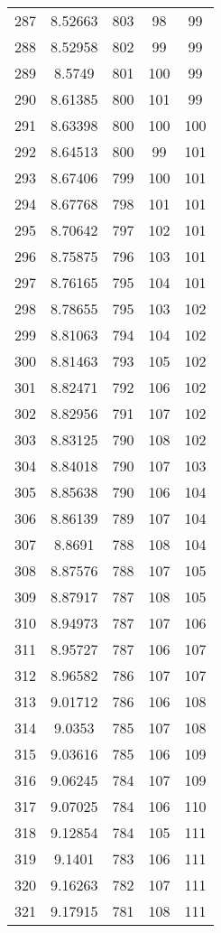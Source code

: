 \documentclass[12pt,a4paper]{article}
\begin{document}
\begin{tabular}{r|cccc}
	287 & 8.52663 & 803 & 98 & 99 \\
	288 & 8.52958 & 802 & 99 & 99 \\
	289 & 8.5749 & 801 & 100 & 99 \\
	290 & 8.61385 & 800 & 101 & 99 \\
	291 & 8.63398 & 800 & 100 & 100 \\
	292 & 8.64513 & 800 & 99 & 101 \\
	293 & 8.67406 & 799 & 100 & 101 \\
	294 & 8.67768 & 798 & 101 & 101 \\
	295 & 8.70642 & 797 & 102 & 101 \\
	296 & 8.75875 & 796 & 103 & 101 \\
	297 & 8.76165 & 795 & 104 & 101 \\
	298 & 8.78655 & 795 & 103 & 102 \\
	299 & 8.81063 & 794 & 104 & 102 \\
	300 & 8.81463 & 793 & 105 & 102 \\
	301 & 8.82471 & 792 & 106 & 102 \\
	302 & 8.82956 & 791 & 107 & 102 \\
	303 & 8.83125 & 790 & 108 & 102 \\
	304 & 8.84018 & 790 & 107 & 103 \\
	305 & 8.85638 & 790 & 106 & 104 \\
	306 & 8.86139 & 789 & 107 & 104 \\
	307 & 8.8691 & 788 & 108 & 104 \\
	308 & 8.87576 & 788 & 107 & 105 \\
	309 & 8.87917 & 787 & 108 & 105 \\
	310 & 8.94973 & 787 & 107 & 106 \\
	311 & 8.95727 & 787 & 106 & 107 \\
	312 & 8.96582 & 786 & 107 & 107 \\
	313 & 9.01712 & 786 & 106 & 108 \\
	314 & 9.0353 & 785 & 107 & 108 \\
	315 & 9.03616 & 785 & 106 & 109 \\
	316 & 9.06245 & 784 & 107 & 109 \\
	317 & 9.07025 & 784 & 106 & 110 \\
	318 & 9.12854 & 784 & 105 & 111 \\
	319 & 9.1401 & 783 & 106 & 111 \\
	320 & 9.16263 & 782 & 107 & 111 \\
	321 & 9.17915 & 781 & 108 & 111 \\

\end{tabular}
\end{document}
